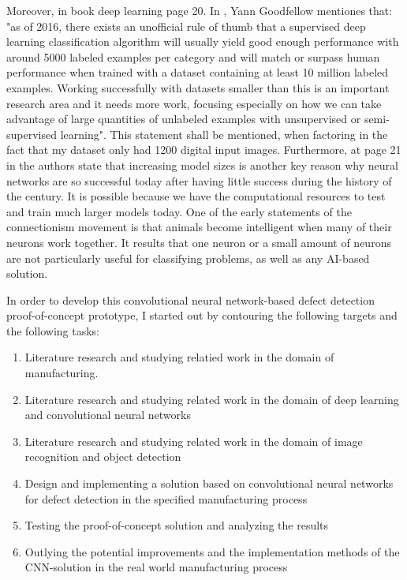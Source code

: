 \documentclass[12pt,a4paper,twoside]{report}
\begin{document}
Moreover, in book deep learning page 20. In \cite{book-deeplearning}, Yann Goodfellow mentiones that: "as of 2016, there exists an unofficial rule of thumb that a supervised deep learning classification algorithm will usually yield good enough performance with around 5000 labeled examples per category and will match or surpass human performance when trained with a dataset containing at least 10 million labeled examples. Working successfully with datasets smaller than this is an important research area and it needs more work, focusing especially on how we can take advantage of large quantities of unlabeled examples with unsupervised or semi-supervised learning". This statement shall be mentioned, when factoring in the fact that my dataset only had 1200 digital input images. Furthermore, at page 21 in \cite{book-deeplearning} the authors state that increasing model sizes is another key reason why neural networks are so successful today after having little success during the history of the  century. It is possible because we have the computational resources to test and train much larger models today. One of the early statements of the connectionism movement is that animals become intelligent when many of their neurons work together. It results that one neuron or a small amount of neurons are not particularly useful for classifying problems, as well as any AI-based solution.\par


In order to develop this convolutional neural network-based defect detection proof-of-concept prototype, I started out by contouring the following targets and the following tasks:

\begin{enumerate}
    \item Literature research and studying relatied work in the domain of manufacturing.
    \item Literature research and studying related work in the domain of deep learning and convolutional neural networks
    \item Literature research and studying related work in the domain of image recognition and object detection
    \item Design and implementing a solution based on convolutional neural networks for defect detection in the specified manufacturing process
    \item Testing the proof-of-concept solution and analyzing the results
    \item Outlying the potential improvements and the implementation methods of the CNN-solution in the real world manufacturing process
\end{enumerate}
\end{document}

